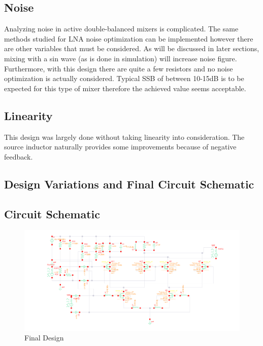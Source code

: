 \documentclass{article}                                                         %
\begin{document}
\subsection{Noise}
Analyzing noise in active double-balanced mixers is complicated. The same methods studied for LNA noise optimization can be implemented however
there are other variables that must be considered. As will be discussed in later sections, mixing with a sin wave (as is done in simulation) will increase noise figure.
Furthermore, with this design there are quite a few resistors and no noise optimization is actually considered. Typical SSB of between 10-15dB is
to be expected for this type of mixer therefore the achieved value seems acceptable.

\subsection{Linearity}
This design was largely done without taking linearity into consideration. The source inductor naturally provides some
improvements because of negative feedback.

\newpage
\begin{landscape}
\section{Design Variations and Final Circuit Schematic}
\subsection{Circuit Schematic}

\begin{figure}[H]
  \centering
  \includegraphics[width=1.5\textwidth] {Figures/Circuit.png}
  \caption{Final Design}
    \label{fig:finalschem}
\end{figure}
\end{landscape}
\newpage
\end{document}
